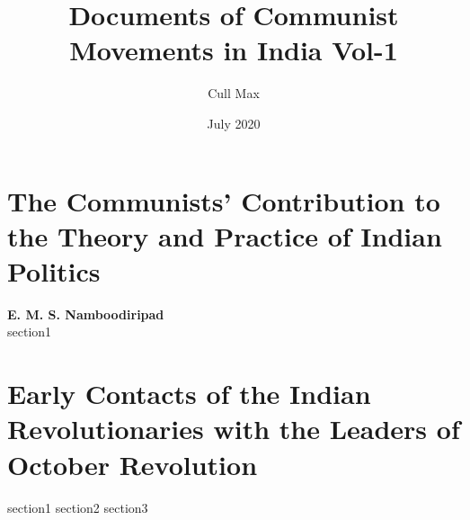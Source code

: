 \documentclass[oneside]{book}
\title{Documents of Communist Movements in India Vol-1}
\author{Cull Max}
\date{July 2020}
\begin{document}
\maketitle
\tableofcontents

\chapter{The Communists’ Contribution to the Theory and Practice of Indian Politics}
\textbf{E. M. S. Namboodiripad}\\
{section1}

\chapter{Early Contacts of the Indian Revolutionaries with the Leaders of October Revolution}
{section1}
{section2}
{section3}
\end{document}
